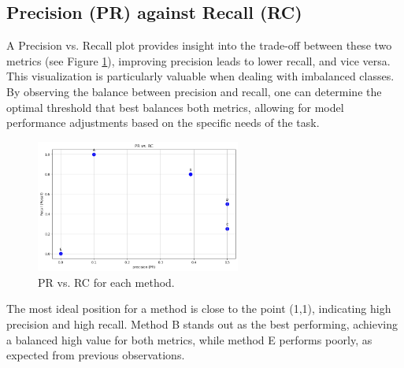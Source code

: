 \documentclass{llncs}
\begin{document}
\subsection{Precision (PR) against Recall (RC)}

A Precision vs. Recall plot provides insight into the trade-off between these two metrics (see Figure \ref{fig:PRyRC}), improving precision leads to lower recall, and vice versa. This visualization is particularly valuable when dealing with imbalanced classes. By observing the balance between precision and recall, one can determine the optimal threshold that best balances both metrics, allowing for model performance adjustments based on the specific needs of the task.


\begin{figure}[h!]
	\begin{center}
		\includegraphics[width=0.6\textwidth]{images/PR_RC.png}
		\caption{PR vs. RC for each method.}
		\label{fig:PRyRC}
	\end{center}
\end{figure}

The most ideal position for a method is close to the point (1,1), indicating high precision and high recall. Method B stands out as the best performing, achieving a balanced high value for both metrics, while method E performs poorly, as expected from previous observations.


\end{document}
